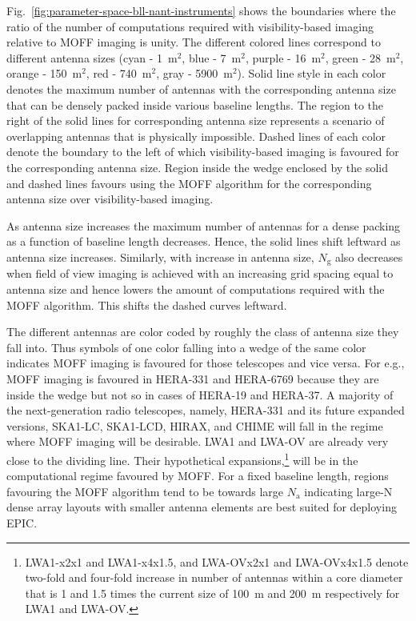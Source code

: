 \documentclass[a4paper,fleqn,usenatbib]{mnras}
\newcommand{\Nant}{N_\textrm{a}}
\newcommand{\Ngrid}{N_\textrm{g}}
\begin{document}
Fig.~\ref{fig:parameter-space-bll-nant-instruments} shows the boundaries where 
the ratio of the number of computations required with visibility-based imaging 
relative to MOFF imaging is unity. The different colored lines correspond to 
different antenna sizes (cyan - 1~m$^2$, blue - 7~m$^2$, purple - 16~m$^2$, 
green - 28~m$^2$, orange - 150~m$^2$, red - 740~m$^2$, gray - 5900~m$^2$). Solid 
line style in each color denotes the maximum number of antennas with the 
corresponding antenna size that can be densely packed inside various baseline 
lengths. The region to the right of the solid lines for corresponding antenna 
size represents a scenario of overlapping antennas that is physically 
impossible. Dashed lines of each color denote the boundary to the left of which 
visibility-based imaging is favoured for the corresponding antenna size. Region 
inside the wedge enclosed by the solid and dashed lines favours using the MOFF 
algorithm for the corresponding antenna size over visibility-based imaging. 

As antenna size increases the maximum number of antennas for a dense packing as 
a function of baseline length decreases. Hence, the solid lines shift leftward 
as antenna size increases. Similarly, with increase in antenna size, $\Ngrid$ 
also decreases when field of view imaging is achieved with an increasing grid 
spacing equal to antenna size and hence lowers the amount of computations 
required with the MOFF algorithm. This shifts the dashed curves leftward. 

The different antennas are color coded by roughly the class of antenna size 
they fall into. Thus symbols of one color falling into a wedge of the same color 
indicates MOFF imaging is favoured for those telescopes and vice versa. For 
e.g., MOFF imaging is favoured in HERA-331 and HERA-6769 because they are inside 
the wedge but not so in cases of HERA-19 and HERA-37. A majority of the 
next-generation radio telescopes, namely, HERA-331 and its future expanded 
versions, SKA1-LC, SKA1-LCD, HIRAX, and CHIME will fall in the regime where MOFF 
imaging will be desirable. LWA1 and LWA-OV are already very close to the dividing 
line. Their hypothetical expansions,\footnote{LWA1-x2x1 and LWA1-x4x1.5, and 
LWA-OVx2x1 and LWA-OVx4x1.5 denote two-fold and four-fold increase in number 
of antennas within a core diameter that is 1 and 1.5 times the current size of 
100~m and 200~m respectively for LWA1 and LWA-OV.} will be in the computational 
regime favoured by MOFF. For a fixed baseline length, regions favouring the MOFF 
algorithm tend to be towards large $\Nant$ indicating large-N dense array 
layouts with smaller antenna elements are best suited for deploying EPIC.
\end{document}
